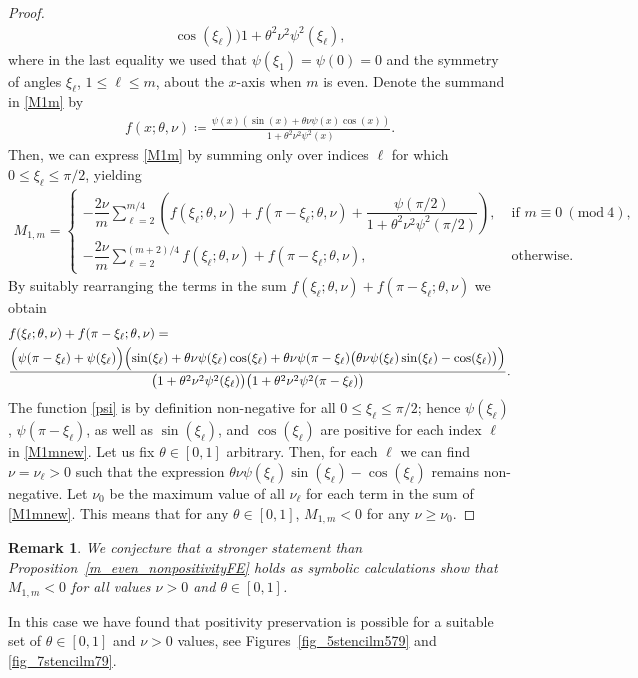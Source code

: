 \documentclass[a4paper]{article}
\newtheorem{remark}{Remark}
\newcommand{\Mod}[1]{\ (\mathrm{mod}\ #1)}
\begin{document}
\begin{description}[style=unboxed,leftmargin=0cm]
\begin{proof}
\begin{align}
{					\cos(\xi_\ell))}{1+\theta^2\nu^2\psi^2(\xi_\ell)},
	\end{align}
	where in the last equality we used that $\psi(\xi_1) = \psi(0) = 0$ and the symmetry of angles
	$\xi_\ell$, $1 \le \ell \le m$, about the $x$-axis when $m$ is even.
	Denote the summand in \eqref{M1m} by
	\begin{align}\label{sumterm}
		f(x; \theta, \nu) \coloneqq \frac{\psi(x)(\sin(x)+\theta\nu\psi(x)\cos(x))}{1+\theta^2\nu^2\psi^2(x)}.
	\end{align}
	Then, we can express \eqref{M1m} by summing only over indices $\ell$ for which $0 \le \xi_\ell  \le \pi/2$,
	yielding
	\begin{align}\label{M1mnew}
		M_{1,m} = \begin{cases}
							-\dfrac{2\nu}{m} \displaystyle{\sum\limits_{\ell=2}^{m/4}} \left(f(\xi_\ell; \theta, \nu) +
								f(\pi-\xi_\ell; \theta, \nu) + \dfrac{\psi(\pi/2)}{1+\theta^2\nu^2\psi^2(\pi/2)}\right),
								&\; \text{if } m \equiv 0 \Mod{4}, \\[20pt]
							-\dfrac{2\nu}{m} \displaystyle{\sum\limits_{\ell=2}^{(m+2)/4}}
								f(\xi_\ell; \theta, \nu) + f(\pi-\xi_\ell; \theta, \nu), &\; \text{otherwise}.
						\end{cases}
	\end{align}
	By suitably rearranging the terms in the sum $f(\xi_\ell; \theta, \nu) + f(\pi-\xi_\ell; \theta, \nu)$ we obtain
	\begin{align*}
		&f(\xi_\ell; \theta, \nu) + f(\pi-\xi_\ell; \theta, \nu) = \\
			&\frac{\Bigl(\psi(\pi-\xi_\ell) + \psi(\xi_\ell)\Bigr)
			\Bigl(\sin(\xi_\ell) + \theta\nu\psi(\xi_\ell)\cos(\xi_\ell) +
			\theta\nu\psi(\pi-\xi_\ell)\bigl(\theta\nu\psi(\xi_\ell)\sin(\xi_\ell)-\cos(\xi_\ell)\bigr)\Bigr)}
				{\bigl(1+\theta^2\nu^2\psi^2(\xi_\ell)\bigr)\bigl(1+\theta^2\nu^2\psi^2(\pi-\xi_\ell)\bigr)}.
	\end{align*}
	The function \eqref{psi} is by definition non-negative for all $0 \le \xi_\ell  \le \pi/2$; hence
	$\psi(\xi_\ell)$, $\psi(\pi-\xi_\ell)$, as well as $\sin(\xi_\ell)$, and $\cos(\xi_\ell)$ are positive for each
	index $\ell$ in \eqref{M1mnew}.
	Let us fix $\theta \in [0,1]$ arbitrary.
	Then, for each $\ell$ we can find $\nu = \nu_\ell > 0$ such that the expression
	$\theta\nu\psi(\xi_\ell)\sin(\xi_\ell)-\cos(\xi_\ell)$ remains non-negative.
	Let $\nu_0$ be the maximum value of all $\nu_\ell$ for each term in the sum of \eqref{M1mnew}.
	This means that for any $\theta \in [0,1]$, $M_{1,m} < 0$ for any $\nu \ge \nu_0$.
\end{proof}
\begin{remark}
	We conjecture that a stronger statement than Proposition~\ref{m_even_nonpositivityFE} holds as symbolic
	calculations show that $M_{1,m} < 0$ for all values $\nu >0$ and $\theta \in [0,1]$.
\end{remark}
\item [{Case 2:} $m$ is {odd}.] In this case we have found that positivity preservation is possible for a suitable
set of $\theta\in[0,1]$ and $\nu>0$ values, see  Figures~\ref{fig_5stencilm579} and \ref{fig_7stencilm79}.


\end{description}
\end{document}
